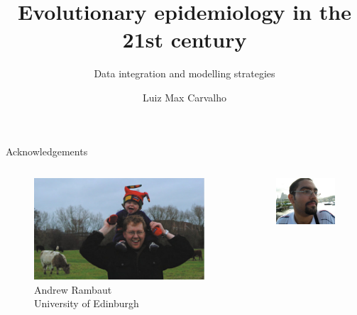 \documentclass[newPxFont,numfooter,sectionpages]{beamer}
\title{Evolutionary epidemiology in the 21st century}
\subtitle{Data integration and modelling strategies}
\author{Luiz Max Carvalho}
\institute{}
\begin{document}
%
%

\maketitle

\begin{frame}{Acknowledgements}
\begin{columns}
\begin{column}{0.3\textwidth}
    \begin{figure}
     \includegraphics[width=\textwidth]{figures/rambaut.png} \\
     Andrew Rambaut \\
     University of Edinburgh
     \end{figure}
\end{column}
\begin{column}{0.3\textwidth}  %
    \begin{figure}
     \includegraphics[width=\textwidth]{figures/leonardobacelarlimasantos.jpg}\\

\end{figure}
\end{column}
\end{columns}
\end{frame}
\end{document}
